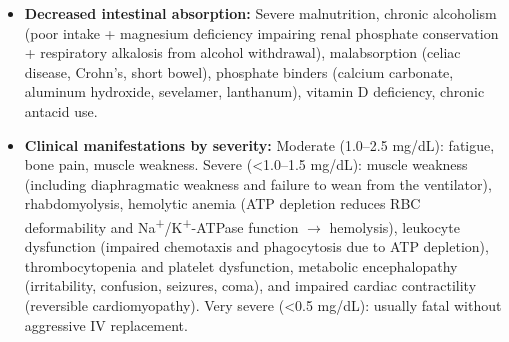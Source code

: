 \begin{itemize}
  \item \textbf{Decreased intestinal absorption:} Severe malnutrition, chronic alcoholism (poor intake + magnesium deficiency impairing renal phosphate conservation + respiratory alkalosis from alcohol withdrawal), malabsorption (celiac disease, Crohn's, short bowel), phosphate binders (calcium carbonate, aluminum hydroxide, sevelamer, lanthanum), vitamin D deficiency, chronic antacid use.
  \item \textbf{Clinical manifestations by severity:} Moderate (1.0--2.5 mg/dL): fatigue, bone pain, muscle weakness. Severe (<1.0--1.5 mg/dL): muscle weakness (including diaphragmatic weakness and failure to wean from the ventilator), rhabdomyolysis, hemolytic anemia (ATP depletion reduces RBC deformability and Na\textsuperscript{+}/K\textsuperscript{+}-ATPase function $\rightarrow$ hemolysis), leukocyte dysfunction (impaired chemotaxis and phagocytosis due to ATP depletion), thrombocytopenia and platelet dysfunction, metabolic encephalopathy (irritability, confusion, seizures, coma), and impaired cardiac contractility (reversible cardiomyopathy). Very severe (<0.5 mg/dL): usually fatal without aggressive IV replacement.
\end{itemize}

